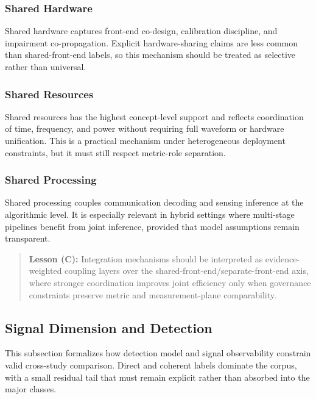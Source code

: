 \subsubsection{Shared Hardware}
Shared hardware captures front-end co-design, calibration discipline, and impairment co-propagation. Explicit hardware-sharing claims are less common than shared-front-end labels, so this mechanism should be treated as selective rather than universal.

\subsubsection{Shared Resources}
Shared resources has the highest concept-level support and reflects coordination of time, frequency, and power without requiring full waveform or hardware unification. This is a practical mechanism under heterogeneous deployment constraints, but it must still respect metric-role separation.

\subsubsection{Shared Processing}
Shared processing couples communication decoding and sensing inference at the algorithmic level. It is especially relevant in hybrid settings where multi-stage pipelines benefit from joint inference, provided that model assumptions remain transparent.

\begin{quote}
\textbf{Lesson (C):} Integration mechanisms should be interpreted as evidence-weighted coupling layers over the shared-front-end/separate-front-end axis, where stronger coordination improves joint efficiency only when governance constraints preserve metric and measurement-plane comparability.
\end{quote}

\subsection{Signal Dimension and Detection}
This subsection formalizes how detection model and signal observability constrain valid cross-study comparison. Direct and coherent labels dominate the corpus, with a small residual tail that must remain explicit rather than absorbed into the major classes.

